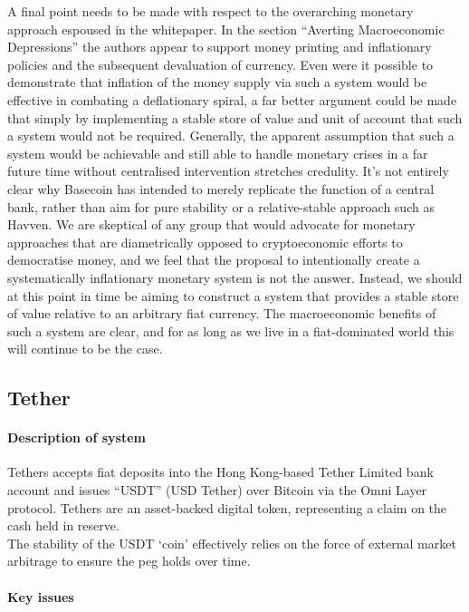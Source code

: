\noindent A final point needs to be made with respect to the overarching monetary approach
espoused in the whitepaper. In the section ``Averting Macroeconomic Depressions'' the authors appear to support
money printing and inflationary policies and the subsequent devaluation of currency. Even were it possible to
demonstrate that inflation of the money supply via such a system would be effective in combating a deflationary spiral,
a far better argument could be made that simply by implementing a stable store of value and unit of account that such a
system would not be required. Generally, the apparent assumption that such a system would be achievable and still able to
handle monetary crises in a far future time without centralised intervention stretches credulity. It's not entirely clear
why Basecoin has intended to merely replicate the function of a central bank, rather than aim for pure stability or a
relative-stable approach such as Havven. We are skeptical of any group that would advocate for monetary approaches that are
diametrically opposed to cryptoeconomic efforts to democratise money, and we feel that the proposal to intentionally
create a systematically inflationary monetary system is not the answer. Instead, we should at this point in time be
aiming to construct a system that provides a stable store of value relative to an arbitrary fiat currency. The macroeconomic
benefits of such a system are clear, and for as long as we live in a fiat-dominated world this will continue to be the case.

\subsection{Tether}

\paragraph{Description of system}

Tethers accepts fiat deposits into the Hong Kong-based Tether Limited bank account and issues ``USDT'' (USD Tether) over Bitcoin via the Omni Layer protocol. Tethers are an asset-backed digital token, representing a claim on the cash held in reserve. \\

\noindent The stability of the USDT `coin' effectively relies on the force of external market arbitrage to ensure the peg holds over time.

\paragraph{Key issues}

